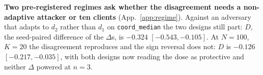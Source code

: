 \documentclass{article}
\begin{document}
\noindent \textbf{Two pre-registered regimes ask whether the disagreement needs a non-adaptive attacker or ten clients} (App.~\ref{app:regime}). Against an adversary that adapts to $d_2$ rather than $d_1$ on \texttt{coord\_median} the two designs still part: $D$, the seed-paired difference of the $\Delta$s, is $-0.324$ $[-0.543,-0.105]$. At $N{=}100$, $K{=}20$ the disagreement reproduces and the sign reversal does not: $D$ is $-0.126$ $[-0.217,-0.035]$, with both designs now reading the dose as protective and neither $\Delta$ powered at $n{=}3$.
\end{document}
